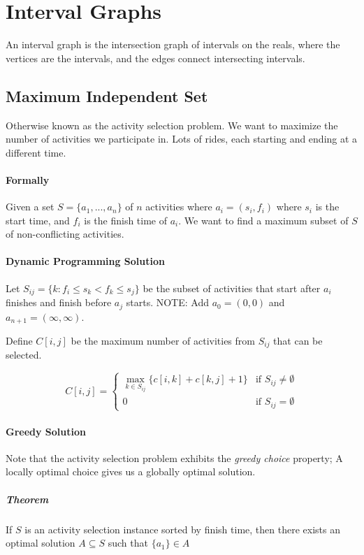 \documentclass[a4paper]{article}
\begin{document}
\section{Interval Graphs}
An interval graph is the intersection graph of intervals on the reals, where the vertices are the intervals, and the edges connect intersecting intervals.

\subsection{Maximum Independent Set}
Otherwise known as the activity selection problem. We want to maximize the number of activities we participate in. Lots of rides, each starting and ending at a different time.

\paragraph{Formally}
Given a set $S=\{a_1,...,a_n\}$ of $n$ activities where $a_i=(s_i, f_i)$ where $s_i$ is the start time, and $f_i$ is the finish time of $a_i$. We want to find a maximum subset of $S$ of non-conflicting activities.

\paragraph{Dynamic Programming Solution}
Let $S_{ij}=\{k:f_i\le s_k<f_k\le s_j\}$ be the subset of activities that start after $a_i$ finishes and finish before $a_j$ starts. NOTE: Add $a_0=(0,0)$ and $a_{n+1}=(\infty, \infty)$.

Define $C[i,j]$ be the maximum number of activities from $S_{ij}$ that can be selected.

\[
C[i,j]=
\begin{cases}
  \max\limits_{k\in S_{ij}}\{c[i,k]+c[k,j]+1\} & \text{if }S_{ij}\ne \emptyset \\
  0 & \text{if }S_{ij}=\emptyset
\end{cases}
\]


\paragraph{Greedy Solution}
Note that the activity selection problem exhibits the \textit{greedy choice} property; A locally optimal choice gives us a globally optimal solution.

\subparagraph{Theorem}
If $S$ is an activity selection instance sorted by finish time, then there exists an optimal solution $A\subseteq S$ such that $\{a_1\}\in A$
\end{document}
